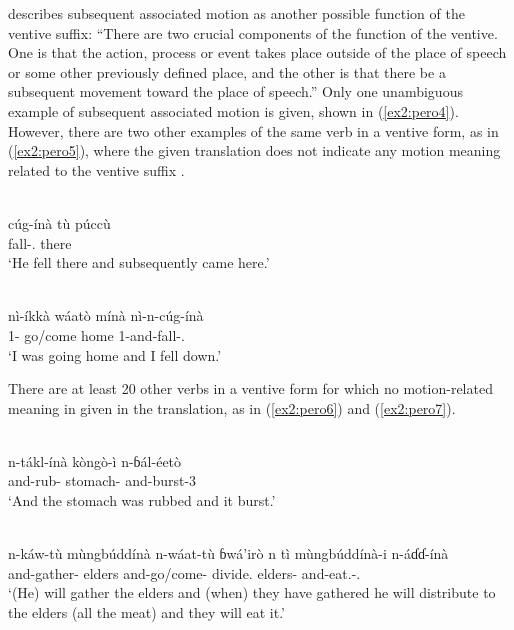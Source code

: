 \citet[94]{frajzyngierGrammarPero1989} describes subsequent associated motion as another possible function of the ventive suffix: ``There are two crucial components of the function of the ventive. One is that the action, process or event takes place outside of the place of speech or some other previously defined place, and the other is that there be a subsequent movement toward the place of speech.'' Only one unambiguous example of subsequent associated motion is given, shown in (\ref{ex2:pero4}). However, there are two other examples of the same verb in a ventive form, as in (\ref{ex2:pero5}), where the given translation does not indicate any motion meaning related to the ventive suffix \citep[see also][242]{frajzyngierGrammarPero1989}.

\ea\label{ex2:pero4}
 \\
\gll  cúg-ínà	tù	púccù \\
fall-.		there	 \\
\glt `He fell there and subsequently came here.'

\ex\label{ex2:pero5}
 \\
\gll nì-íkkà	wáatò	mínà	nì-n-cúg-ínà \\
1-	go/come	home	1-and-fall-. \\
\glt `I was going home and I fell down.'
\z

There are at least 20 other verbs in a ventive form for which no motion-related meaning in given in the translation, as in (\ref{ex2:pero6}) and (\ref{ex2:pero7}).

\ea\label{ex2:pero6}
 \\
\gll  n-tákl-ínà	kòngò-ì	n-ɓál-éetò \\
and-rub-	stomach-	and-burst-3 \\
\glt `And the stomach was rubbed and it burst.'

\ex\label{ex2:pero7}
 \\
\gll n-káw-tù	mùngbúddínà n-wáat-tù	ɓwá'irò	n	tì	mùngbúddínà-i n-áɗɗ-ínà \\
and-gather-	elders and-go/come-	divide.			elders- and-eat.-. \\
\glt `(He) will gather the elders and (when) they have gathered he will distribute to the elders (all the meat) and they will eat it.'
\z

